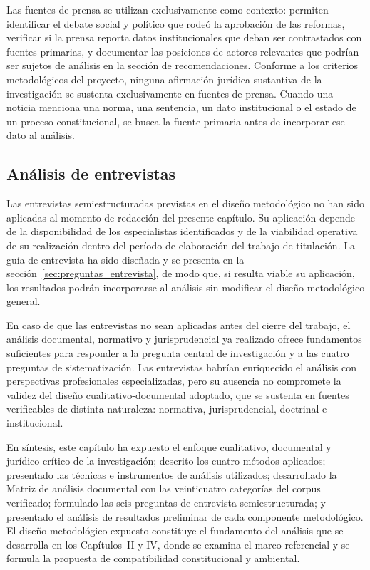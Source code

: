 Las fuentes de prensa se utilizan exclusivamente como contexto: permiten identificar el debate social y político que rodeó la aprobación de las reformas, verificar si la prensa reporta datos institucionales que deban ser contrastados con fuentes primarias, y documentar las posiciones de actores relevantes que podrían ser sujetos de análisis en la sección de recomendaciones. Conforme a los criterios metodológicos del proyecto, ninguna afirmación jurídica sustantiva de la investigación se sustenta exclusivamente en fuentes de prensa. Cuando una noticia menciona una norma, una sentencia, un dato institucional o el estado de un proceso constitucional, se busca la fuente primaria antes de incorporar ese dato al análisis.

\subsection{Análisis de entrevistas}
\label{sec:analisis_entrevistas}

Las entrevistas semiestructuradas previstas en el diseño metodológico no han sido aplicadas al momento de redacción del presente capítulo. Su aplicación depende de la disponibilidad de los especialistas identificados y de la viabilidad operativa de su realización dentro del período de elaboración del trabajo de titulación. La guía de entrevista ha sido diseñada y se presenta en la sección~\ref{sec:preguntas_entrevista}, de modo que, si resulta viable su aplicación, los resultados podrán incorporarse al análisis sin modificar el diseño metodológico general.

En caso de que las entrevistas no sean aplicadas antes del cierre del trabajo, el análisis documental, normativo y jurisprudencial ya realizado ofrece fundamentos suficientes para responder a la pregunta central de investigación y a las cuatro preguntas de sistematización. Las entrevistas habrían enriquecido el análisis con perspectivas profesionales especializadas, pero su ausencia no compromete la validez del diseño cualitativo-documental adoptado, que se sustenta en fuentes verificables de distinta naturaleza: normativa, jurisprudencial, doctrinal e institucional.

\bigskip

En síntesis, este capítulo ha expuesto el enfoque cualitativo, documental y jurídico-crítico de la investigación; descrito los cuatro métodos aplicados; presentado las técnicas e instrumentos de análisis utilizados; desarrollado la Matriz de análisis documental con las veinticuatro categorías del corpus verificado; formulado las seis preguntas de entrevista semiestructurada; y presentado el análisis de resultados preliminar de cada componente metodológico. El diseño metodológico expuesto constituye el fundamento del análisis que se desarrolla en los Capítulos~II y IV, donde se examina el marco referencial y se formula la propuesta de compatibilidad constitucional y ambiental.
